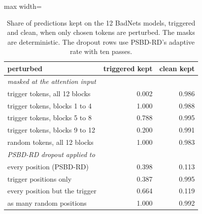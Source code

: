 \begin{table}[htbp]
\centering
\small
\caption{Share of predictions kept on the 12 BadNets models, triggered and clean, when only chosen tokens are perturbed. The masks are deterministic. The dropout rows use PSBD-RD's adaptive rate with ten passes.}
\label{tab:causal-patch}
\begin{adjustbox}{max width=\linewidth}
\begin{tabular}{lrr}
\toprule
perturbed & triggered kept & clean kept \\
\midrule
\multicolumn{3}{l}{\emph{masked at the attention input}} \\
trigger tokens, all 12 blocks & 0.002 & 0.986 \\
trigger tokens, blocks 1 to 4 & 1.000 & 0.988 \\
trigger tokens, blocks 5 to 8 & 0.788 & 0.995 \\
trigger tokens, blocks 9 to 12 & 0.200 & 0.991 \\
random tokens, all 12 blocks & 1.000 & 0.983 \\
\multicolumn{3}{l}{\emph{PSBD-RD dropout applied to}} \\
every position (PSBD-RD) & 0.398 & 0.113 \\
trigger positions only & 0.387 & 0.995 \\
every position but the trigger & 0.664 & 0.119 \\
as many random positions & 1.000 & 0.992 \\
\bottomrule
\end{tabular}
\end{adjustbox}
\end{table}
